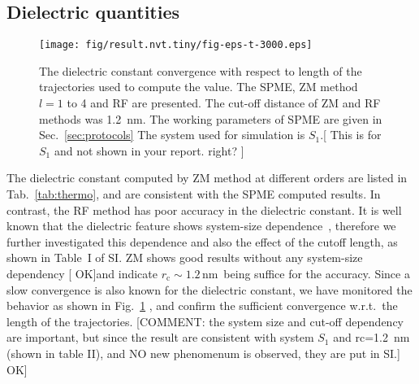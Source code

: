 \documentclass[a4paper,preprint,unsortedaddress,onecolumn,fleqn]{revtex4}
\newcommand{\systemlb}{L_1}
\begin{document}

\subsection{Dielectric quantities}

\begin{figure}[tbp]
\centering
\texttt{[image: fig/result.nvt.tiny/fig-eps-t-3000.eps]}
\caption{The dielectric constant convergence with respect to length of the
trajectories used to compute the value. The SPME, ZM method $l=1$ to 4 and
RF are presented. The cut-off distance of ZM and RF methods was 1.2~nm. The
working parameters of SPME are given in Sec.~\protect\ref{sec:protocols} The
system used for simulation is $S_{1}$.[ {\color{blue} This is for $S_{1}$
and not shown in your report. right? }]}
\label{fig:eps-conv}
\end{figure}

The dielectric constant computed by ZM method at different orders are listed
in Tab.~\ref{tab:thermo}, and are consistent with the SPME computed results.
In contrast, the RF method has poor accuracy in the dielectric constant. It
is well known that the dielectric feature shows system-size dependence~\cite%
{vanderSpoel2006origin}, therefore we further investigated this dependence
and also the effect of the cutoff length, as shown in Table~I of SI. ZM
shows good results without any {\color{red} system-size dependency} {[} {%
\color{blue} OK}]and indicate $r_{\text{c}}\sim 1.2\,$nm\ being suffice for
the accuracy. Since a slow convergence is also known for the dielectric
constant, we have monitored the behavior as shown in Fig.~\ref{fig:eps-conv}%
, and confirm the sufficient convergence w.r.t.~the length of the
trajectories. {%
\color{red} [COMMENT: the system size and cut-off dependency
  are important,
  but since the result are consistent with system $S_1$ and rc=1.2~nm (shown in table II),
  and NO new phenomenum is observed, 
  they are put in SI.]\lbrack } {\color{blue} OK}]
\end{document}

